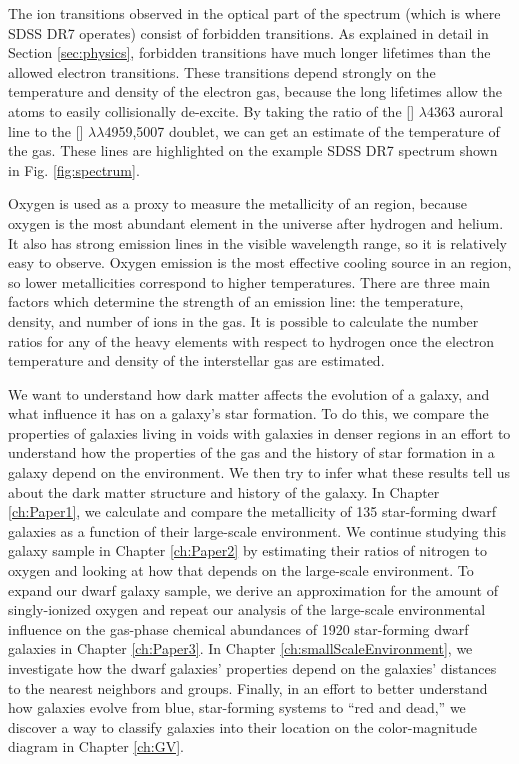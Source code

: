 The ion transitions observed in the optical part of the spectrum (which is where 
SDSS DR7 operates) consist of forbidden transitions.  As explained in detail in 
Section \ref{sec:physics}, forbidden transitions have much longer lifetimes than 
the allowed electron transitions.  These transitions depend strongly on the 
temperature and density of the electron gas, because the long lifetimes allow 
the atoms to easily collisionally de-excite.  By taking the ratio of the 
[] $\lambda$4363 auroral line to the [] 
$\lambda \lambda$4959,5007 doublet, we can get an estimate of the temperature of 
the gas.  These lines are highlighted on the example SDSS DR7 spectrum shown in 
Fig. \ref{fig:spectrum}.  

Oxygen is used as a proxy to measure the metallicity of an  region, 
because oxygen is the most abundant element in the universe after hydrogen and 
helium.  It also has strong emission lines in the visible wavelength range, so 
it is relatively easy to observe.  Oxygen emission is the most effective cooling 
source in an  region, so lower metallicities correspond to higher 
temperatures.  There are three main factors which determine the strength of an 
emission line: the temperature, density, and number of ions in the gas.  It is 
possible to calculate the number ratios for any of the heavy elements with 
respect to hydrogen once the electron temperature and density of the 
interstellar gas are estimated.


We want to understand how dark matter affects the evolution of a galaxy, and 
what influence it has on a galaxy's star formation.  To do this, we compare the 
properties of galaxies living in voids with galaxies in denser regions in an 
effort to understand how the properties of the gas and the history of star 
formation in a galaxy depend on the environment.  We then try to infer what 
these results tell us about the dark matter structure and history of the galaxy.  
In Chapter \ref{ch:Paper1}, we calculate and compare the metallicity of 135 
star-forming dwarf galaxies as a function of their large-scale environment.  We 
continue studying this galaxy sample in Chapter \ref{ch:Paper2} by estimating 
their ratios of nitrogen to oxygen and looking at how that depends on the 
large-scale environment.  To expand our dwarf galaxy sample, we derive an 
approximation for the amount of singly-ionized oxygen and repeat our analysis of 
the large-scale environmental influence on the gas-phase chemical abundances of 
1920 star-forming dwarf galaxies in Chapter \ref{ch:Paper3}.  In Chapter 
\ref{ch:smallScaleEnvironment}, we investigate how the dwarf galaxies' 
properties depend on the galaxies' distances to the nearest neighbors and 
groups.  Finally, in an effort to better understand how galaxies evolve from 
blue, star-forming systems to ``red and dead,'' we discover a way to classify 
galaxies into their location on the color-magnitude diagram in Chapter 
\ref{ch:GV}.
